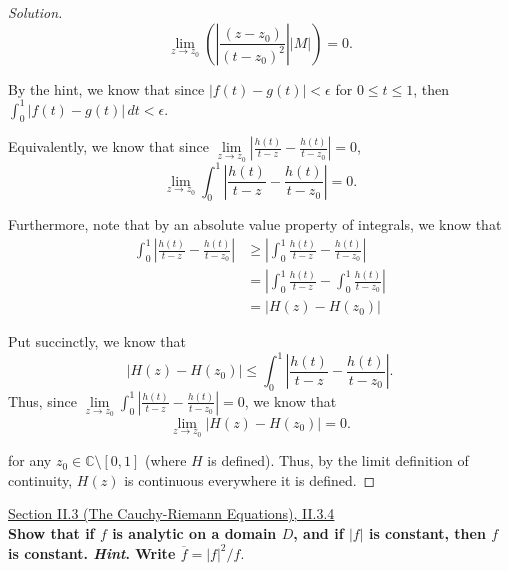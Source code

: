 \documentclass[11pt]{article}
\newcommand{\C}{\mathbb{C}}
\newenvironment{solution}
  {\renewcommand\qedsymbol{$\blacksquare$}\begin{proof}[Solution]}
  {\end{proof}}
\theoremstyle{definition}
\begin{document}
\begin{solution}
\[  \lim\limits_{z \rightarrow z_0} \left(\left| \frac{(z-z_0)}{(t-z_0)^2}\right| |M| \right) = 0.\]

By the hint, we know that since $|f(t) - g(t)| < \epsilon$ for $0 \leq t \leq 1$, then $\int_0^1 |f(t) - g(t)| \, dt  < \epsilon.$ 

Equivalently, we know that since $\lim\limits_{z \rightarrow z_0} \left| \frac{h(t)}{t-z} - \frac{h(t)}{t-z_0} \right| = 0$, \[ \lim\limits_{z \rightarrow z_0}\int_0^1 \left| \frac{h(t)}{t-z} - \frac{h(t)}{t-z_0} \right| = 0. \]

Furthermore, note that by an absolute value property of integrals, we know that
\begin{align*}
    \int_0^1 \left| \frac{h(t)}{t-z} - \frac{h(t)}{t-z_0} \right| &\geq \left| \int_0^1 \frac{h(t)}{t-z} - \frac{h(t)}{t-z_0}\right| \\
    &= \left| \int_0^1 \frac{h(t)}{t-z} - \int_0^1 \frac{h(t)}{t-z_0} \right| \\
    &= |H(z) - H(z_0)|
\end{align*}

Put succinctly, we know that \[ |H(z) - H(z_0)| \leq \int_0^1 \left| \frac{h(t)}{t-z} - \frac{h(t)}{t-z_0} \right|. \]
Thus, since $\lim\limits_{z \rightarrow z_0}\int_0^1 \left| \frac{h(t)}{t-z} - \frac{h(t)}{t-z_0} \right| = 0$, we know that 
\[ \lim\limits_{z \rightarrow z_0} |H(z) - H(z_0)| = 0.\]

for any $z_0 \in \C \setminus [0, 1]$ (where $H$ is defined). Thus, by the limit definition of continuity, $H(z)$ is continuous everywhere it is defined.
\end{solution}

\newpage

\underline{Section II.3 (The Cauchy-Riemann Equations), II.3.4} \\

\textbf{Show that if $f$ is analytic on a domain $D$, and if $|f|$ is constant, then $f$ is constant. \textit{Hint}. Write $\overline{f} = |f|^2/f.$}
\end{document}

